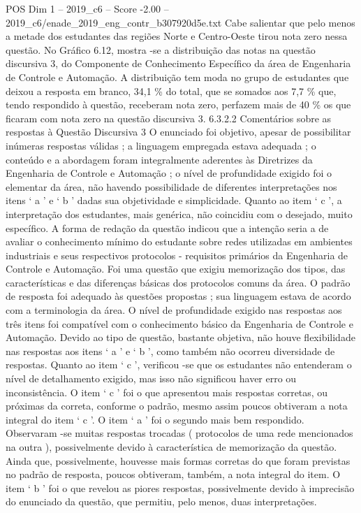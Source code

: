 \begin{textsample}{POS Dim 1 – 2019\_c6 – Score -2.00 – 2019\_c6/enade\_2019\_eng\_contr\_b307920d5e.txt}
Cabe salientar que pelo menos a metade dos estudantes das regiões Norte e Centro-Oeste tirou nota zero nessa questão.
No Gráfico 6.12, mostra -se a distribuição das notas na questão discursiva 3, do Componente de Conhecimento Específico da área de Engenharia de Controle e Automação.
A distribuição tem moda no grupo de estudantes que deixou a resposta em branco, 34,1 \% do total, que se somados aos 7,7 \% que, tendo respondido à questão, receberam nota zero, perfazem mais de 40 \% os que ficaram com nota zero na questão discursiva 3. 6.3.2.2 Comentários sobre as respostas à Questão Discursiva 3 O enunciado foi objetivo, apesar de possibilitar inúmeras respostas válidas ; a linguagem empregada estava adequada ; o conteúdo e a abordagem foram integralmente aderentes às Diretrizes da Engenharia de Controle e Automação ; o nível de profundidade exigido foi o elementar da área, não havendo possibilidade de diferentes interpretações nos itens ‘ a ’ e ‘ b ’ dadas sua objetividade e simplicidade.
Quanto ao item ‘ c ’, a interpretação dos estudantes, mais genérica, não coincidiu com o desejado, muito específico.
A forma de redação da questão indicou que a intenção seria a de avaliar o conhecimento mínimo do estudante sobre redes utilizadas em ambientes industriais e seus respectivos protocolos - requisitos primários da Engenharia de Controle e Automação.
Foi uma questão que exigiu memorização dos tipos, das características e das diferenças básicas dos protocolos comuns da área.
O padrão de resposta foi adequado às questões propostas ; sua linguagem estava de acordo com a terminologia da área.
O nível de profundidade exigido nas respostas aos três itens foi compatível com o conhecimento básico da Engenharia de Controle e Automação.
Devido ao tipo de questão, bastante objetiva, não houve flexibilidade nas respostas aos itens ‘ a ’ e ‘ b ’, como também não ocorreu diversidade de respostas.
Quanto ao item ‘ c ’, verificou -se que os estudantes não entenderam o nível de detalhamento exigido, mas isso não significou haver erro ou inconsistência.
O item ‘ c ’ foi o que apresentou mais respostas corretas, ou próximas da correta, conforme o padrão, mesmo assim poucos obtiveram a nota integral do item ‘ c ’.
O item ‘ a ’ foi o segundo mais bem respondido.
Observaram -se muitas respostas trocadas ( protocolos de uma rede mencionados na outra ), possivelmente devido à característica de memorização da questão.
Ainda que, possivelmente, houvesse mais formas corretas do que foram previstas no padrão de resposta, poucos obtiveram, também, a nota integral do item.
O item ‘ b ’ foi o que revelou as piores respostas, possivelmente devido à imprecisão do enunciado da questão, que permitiu, pelo menos, duas interpretações.

\end{textsample}
